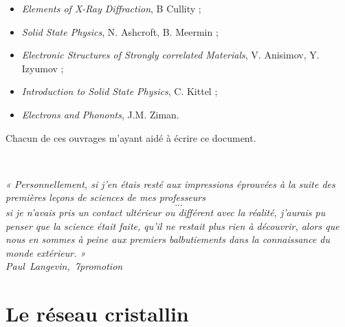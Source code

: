\documentclass[a4paper,justified,twoside,nobib]{tufte-book}
\renewcommand{\=}[1]{\stackrel{#1}{=}} %
\begin{document}
\begin{itemize}
    \item \emph{Elements of X-Ray Diffraction}, B Cullity ;
    \item \emph{Solid State Physics}, N. Ashcroft, B. Meermin ;
    \item \emph{Electronic Structures of Strongly correlated Materials}, V.
        Anisimov, Y. Izyumov ;
    \item \emph{Introduction to Solid State Physics}, C. Kittel ;
    \item \emph{Electrons and Phononts}, J.M. Ziman. 
\end{itemize}

Chacun de ces ouvrages m'ayant aidé à écrire ce document.

\tableofcontents\thispagestyle{empty}



\cleardoublepage
~\vfill
\begin{doublespace}
\noindent\fontsize{18}{22}\selectfont\itshape
\nohyphenation
« Personnellement, si j'en étais resté aux impressions éprouvées à la suite des 
premières leçons de sciences de mes professeurs \[...\] si je n'avais pris un
contact ultérieur ou différent avec la réalité, j'aurais pu penser que la 
science était faite, qu'il ne restait plus rien à découvrir, alors que nous en 
sommes à peine aux premiers balbutiements dans la connaissance du monde 
extérieur. »\\
\mbox{Paul Langevin, 7\ieme promotion}
\end{doublespace}
\vfill
\vfill

\mainmatter

\part[LE RÉSEAU CRISTALLIN]{Le réseau cristallin}




%
%

\end{document}
